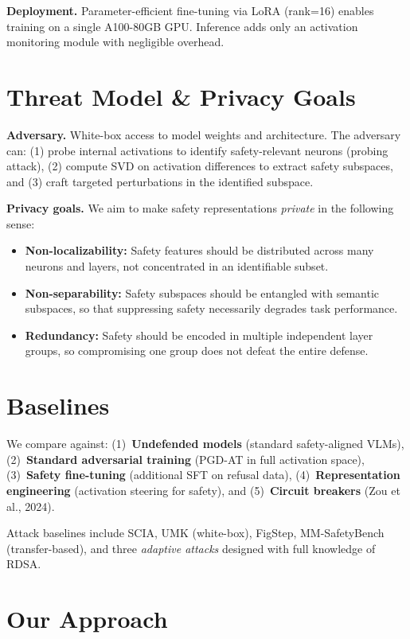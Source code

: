 \documentclass[11pt]{article}
\begin{document}
\textbf{Deployment.} Parameter-efficient fine-tuning via LoRA (rank=16) enables training on a single A100-80GB GPU. Inference adds only an activation monitoring module with negligible overhead.

\section{Threat Model \& Privacy Goals}

\textbf{Adversary.} White-box access to model weights and architecture. The adversary can: (1) probe internal activations to identify safety-relevant neurons (probing attack), (2) compute SVD on activation differences to extract safety subspaces, and (3) craft targeted perturbations in the identified subspace.

\textbf{Privacy goals.} We aim to make safety representations \emph{private} in the following sense:
\begin{itemize}
  \item \textbf{Non-localizability:} Safety features should be distributed across many neurons and layers, not concentrated in an identifiable subset.
  \item \textbf{Non-separability:} Safety subspaces should be entangled with semantic subspaces, so that suppressing safety necessarily degrades task performance.
  \item \textbf{Redundancy:} Safety should be encoded in multiple independent layer groups, so compromising one group does not defeat the entire defense.
\end{itemize}

\section{Baselines}

We compare against: (1)~\textbf{Undefended models} (standard safety-aligned VLMs), (2)~\textbf{Standard adversarial training} (PGD-AT in full activation space), (3)~\textbf{Safety fine-tuning} (additional SFT on refusal data), (4)~\textbf{Representation engineering} (activation steering for safety), and (5)~\textbf{Circuit breakers} (Zou et al., 2024).

Attack baselines include SCIA, UMK (white-box), FigStep, MM-SafetyBench (transfer-based), and three \emph{adaptive attacks} designed with full knowledge of RDSA.

\section{Our Approach}
\end{document}
